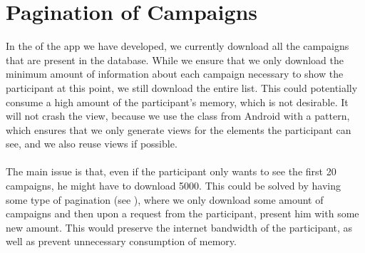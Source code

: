 
\section{Pagination of Campaigns}
\label{sec:pagination_of_campaigns}

In the  of the app we have developed, we currently download all the campaigns that are present in the database. While we ensure that we only download the minimum amount of information about each campaign necessary to show the participant at this point, we still download the entire list. This could potentially consume a high amount of the participant's memory, which is not desirable. It will not crash the view, because we use the  class from Android with a  pattern, which ensures that we only generate views for the elements the participant can see, and we also reuse views if possible.
\\\\
The main issue is that, even if the participant only wants to see the first 20 campaigns, he might have to download 5000. This could be solved by having some type of pagination (see ), where we only download some amount of campaigns and then upon a request from the participant, present him with some new amount. This would preserve the internet bandwidth of the participant, as well as prevent unnecessary consumption of memory.